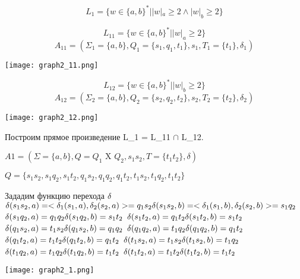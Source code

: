 \documentclass[a4paper, 12pt]{article}
\begin{document}
\subsection{}
$$L_1 = \{ w \in \{a,b\}^* | |w|_a \geq 2 \land |w|_b \geq 2\}$$

$$L_{11} = \{ w \in \{a,b\}^* | |w|_a \geq 2 \}$$
$$A_{11} = (\Sigma_1 = \{a, b\}, Q_1 = \{s_1, q_1, t_1\}, s_1, T_1 = \{t_1\}, \delta_1)$$
\begin{center}
    \texttt{[image: graph2\_11.png]}
\end{center}

$$L_{12} = \{ w \in \{a,b\}^* | |w|_b \geq 2 \}$$
$$A_{12} = (\Sigma_2 = \{a, b\}, Q_2 = \{s_2, q_2, t_2\}, s_2, T_2 = \{t_2\}, \delta_2)$$
\begin{center}
    \texttt{[image: graph2\_12.png]}
\end{center}
Построим прямое произведение L_1 = L_{11} $\cap$ L_{12}.


$A1 = (\Sigma = \{a, b\}, Q = Q_1 \text{ X } Q_2, s_1s_2, T = \{t_1t_2\}, \delta)$

$Q = \{s_1s_2, s_1q_2, s_1t_2, q_1s_2, q_1q_2, q_1t_2, t_1s_2, t_1q_2, t_1t_2\}$

Зададим функцию перехода $\delta\\$
\nointend
$\delta(s_1s_2, a) = <\delta_1(s_1, a), \delta_2(s_2, a)> = q_1s_2 \hfill \delta(s_1s_2, b) = <\delta_1(s_1, b), \delta_2(s_2, b)> = s_1q_2\\$
$\delta(s_1q_2, a) = q_1q_2 \hfill \delta(s_1q_2, b) = s_1t_2\\$
$\delta(s_1t_2, a) = q_1t_2 \hfill \delta(s_1t_2, b) = s_1t_2\\$
$\delta(q_1s_2, a) = t_1s_2 \hfill \delta(q_1s_2, b) = q_1q_2\\$
$\delta(q_1q_2, a) = t_1q_2 \hfill \delta(q_1q_2, b) = q_1t_2\\$
$\delta(q_1t_2, a) = t_1t_2 \hfill \delta(q_1t_2, b) = q_1t_2\\$
$\delta(t_1s_2, a) = t_1s_2 \hfill \delta(t_1s_2, b) = t_1q_2\\$
$\delta(t_1q_2, a) = t_1q_2 \hfill \delta(t_1q_2, b) = t_1t_2\\$
$\delta(t_1t_2, a) = t_1t_2 \hfill \delta(t_1t_2, b) = t_1t_2\\$

\begin{center}
    \texttt{[image: graph2\_1.png]}
\end{center}
\end{document}
